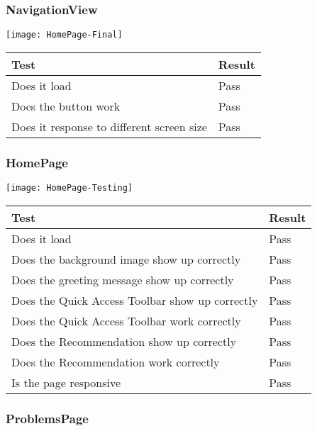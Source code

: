 \documentclass[report.tex]{subfiles}
\begin{document}
\subsubsection{NavigationView}

\texttt{[image: HomePage-Final]}

\begin{tabulary}{\linewidth}{|L|l|}
    \hline
    Test & Result \\
    \hline
    Does it load & Pass \\
    \hline
    Does the button work & Pass \\
    \hline
    Does it response to different screen size & Pass \\
    \hline
\end{tabulary}

\subsubsection{HomePage}

\texttt{[image: HomePage-Testing]}

\begin{tabulary}{\linewidth}{|L|l|}
    \hline
    Test & Result \\
    \hline
    Does it load & Pass \\
    \hline
    Does the background image show up correctly & Pass \\
    \hline
    Does the greeting message show up correctly & Pass \\
    \hline
    Does the Quick Access Toolbar show up correctly & Pass \\
    \hline
    Does the Quick Access Toolbar work correctly & Pass \\
    \hline
    Does the Recommendation show up correctly & Pass \\
    \hline
    Does the Recommendation work correctly & Pass \\
    \hline
    Is the page responsive & Pass \\
    \hline
\end{tabulary}

\subsubsection{ProblemsPage}
\end{document}
